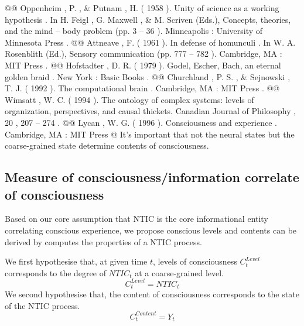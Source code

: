 \begin{WritingMaterials}
				@@ Oppenheim , P. , \& Putnam , H. ( 1958 ). Unity of science as a working hypothesis . In H. Feigl , G. Maxwell , \& M. Scriven (Eds.), Concepts, theories, and the mind – body problem (pp. 3 – 36 ). Minneapolis : University of Minnesota Press .
				@@ Attneave , F. ( 1961 ). In defense of homunculi . In W. A. Rosenblith (Ed.), Sensory communication (pp. 777 – 782 ). Cambridge, MA : MIT Press .
				@@ Hofstadter , D. R. ( 1979 ). Godel, Escher, Bach, an eternal golden braid . New York : Basic Books .
				@@ Churchland , P. S. , \& Sejnowski , T. J. ( 1992 ). The computational brain . Cambridge, MA : MIT Press .
				@@ Wimsatt , W. C. ( 1994 ). The ontology of complex systems: levels of organization, perspectives, and causal thickets. Canadian Journal of Philosophy , 20 , 207 – 274 .
				@@ Lycan ,  W. G.  ( 1996 ).  Consciousness and experience .  Cambridge, MA :  MIT Press
			@ It's important that not the neural states but the coarse-grained state determine contents of consciousness.

        

		\end{WritingMaterials}


\rlend







		\subsection{Measure of consciousness/information correlate of consciousness}	
		Based on our core assumption that NTIC is the core informational entity correlating conscious experience, we propose conscious levels and contents can be derived by computes the properties of a NTIC process. \newline
		
		\noindent
		We first hypothesise that, at given time $t$, levels of consciousness $C_{t}^{Level}$ corresponds to the degree of  $NTIC_{t}$ at a coarse-grained level.
			\begin{equation}\label{eq:cLevel}
				C_{t}^{Level} = NTIC_{t}
			\end{equation}
		\newline
		\noindent 
		We second hypothesise that, the content of consciousness corresponds to the state of the NTIC process.
			\begin{equation}\label{eq:cContent}
				C_{t}^{Content} = Y_{t}
			\end{equation}
		
